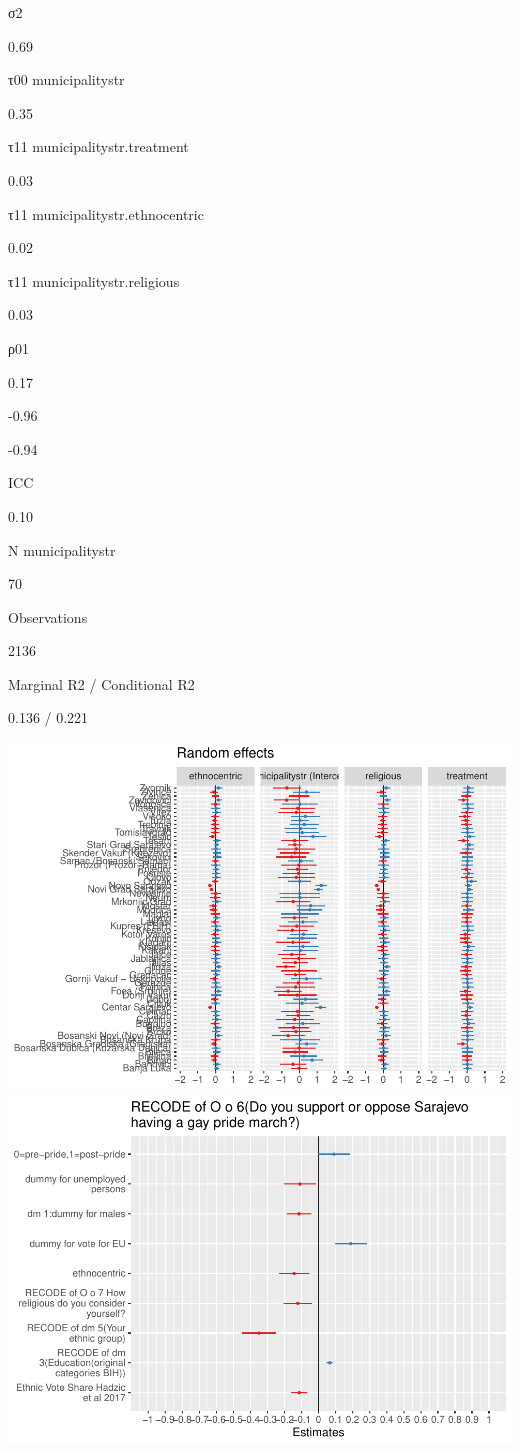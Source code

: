 \documentclass[
]{article}
\begin{document}
σ2

0.69

τ00 municipalitystr

0.35

τ11 municipalitystr.treatment

0.03

τ11 municipalitystr.ethnocentric

0.02

τ11 municipalitystr.religious

0.03

ρ01

0.17

-0.96

-0.94

ICC

0.10

N municipalitystr

70

Observations

2136

Marginal R2 / Conditional R2

0.136 / 0.221

\includegraphics{SMI205_Assessment2_Template_files/figure-latex/outputs-1.pdf}
\includegraphics{SMI205_Assessment2_Template_files/figure-latex/outputs-2.pdf}
\end{document}
